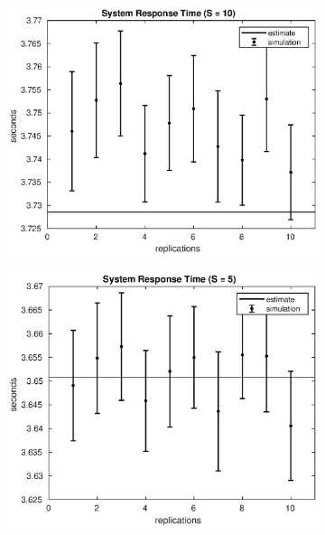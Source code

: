 \begin{frame}
\begin{figure}[!h]
\begin{subfigure}[t]{0.49\textwidth}
\label{15_s}
\end{subfigure}
%
\begin{subfigure}[t]{0.49\textwidth}
\includegraphics[width=\textwidth]{../figures/simul/10_500K_s}
\label{10_s}
\end{subfigure}
%
\begin{subfigure}[t]{0.49\textwidth}
\includegraphics[width=\textwidth]{../figures/simul/5_500K_s}
\label{5_s}
\end{subfigure}
%
\label{plot:s}
\end{figure}
%
%
\end{frame}

